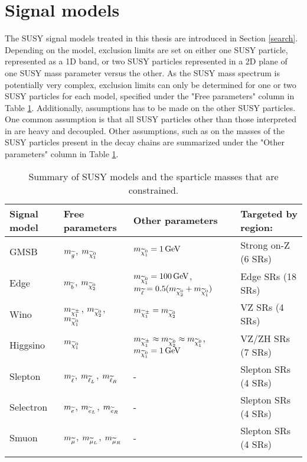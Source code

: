 \section{Signal models}
\noindent
\justify
The SUSY signal models treated in this thesis are introduced in Section \ref{search}. 
Depending on the model, exclusion limits are set on either one SUSY particle, represented as a 1D band, or two SUSY particles represented in a 2D plane of one SUSY mass parameter versus the other.    
As the SUSY mass spectrum is potentially very complex, exclusion limits can only be determined for one or two SUSY particles for each model, specified under the "Free parameters" column in Table \ref{tab:signal}. 
Additionally, assumptions has to be made on the other SUSY particles.
One common assumption is that all SUSY particles other than those interpreted in are heavy and decoupled. 
Other assumptions, such as on the masses of the SUSY particles present in the decay chains are summarized under the "Other parameters" column in Table \ref{tab:signal}.  
\begin{table}[!hbtp]
\renewcommand{\arraystretch}{1.2}
\setlength{\belowcaptionskip}{6pt}
\small
\centering                             
\caption{Summary of SUSY models and the sparticle masses that are constrained.}
\begin{tabular}{l l l l}
\hline\hline
Signal model                         & Free parameters    & Other parameters & Targeted by region:    \\
\hline
GMSB                                 & $m_{\widetilde{g}}$, $m_{\widetilde{\chi}^{0}_{1}}$   & $m_{\widetilde{\chi}^{0}_{1}}=1\,\text{Ge\hspace{-.08em}V}$   & Strong on-Z (6 SRs)\\                          
Edge                                 & $m_{\widetilde{b}}$, $m_{\widetilde{\chi}^{0}_{2}}$  & $m_{\widetilde{\chi}^{0}_{1}}=100\,\text{Ge\hspace{-.08em}V}$, $m_{\widetilde{\ell}}=0.5(m_{\widetilde{\chi}^{0}_{2}}+m_{\widetilde{\chi}^{0}_{1}})$   & Edge SRs (18 SRs)\\                          
Wino                                 & $m_{\widetilde{\chi}^\pm_{1}}$, $m_{\widetilde{\chi}^{0}_{2}}$, $m_{\widetilde{\chi}^{0}_{1}}$  & $m_{\widetilde{\chi}^\pm_{1}}=m_{\widetilde{\chi}^{0}_{2}}$   & VZ SRs (4 SRs)\\                          
Higgsino                             & $m_{\widetilde{\chi}^{0}_{1}}$  & $m_{\widetilde{\chi}^\pm_{1}}\approx m_{\widetilde{\chi}^{0}_{2}}\approx m_{\widetilde{\chi}^{0}_{1}}$, $m_{\widetilde{\chi}^{0}_{1}}=1\,\text{Ge\hspace{-.08em}V}$   & VZ/ZH SRs (7 SRs)\\                          
Slepton                              & $m_{\widetilde{\ell}}$, $m_{\widetilde{\ell}_{L}}$, $m_{\widetilde{\ell}_{R}}$  & -   & Slepton SRs (4 SRs)\\                          
Selectron                            & $m_{\widetilde{e}}$, $m_{\widetilde{e}_{L}}$, $m_{\widetilde{e}_{R}}$  & -  & Slepton SRs (4 SRs)\\                          
Smuon                                & $m_{\widetilde{\mu}}$, $m_{\widetilde{\mu}_{L}}$, $m_{\widetilde{\mu}_{R}}$  & -   & Slepton SRs (4 SRs)\\                          
\hline\hline
\label{tab:signal}
\end{tabular}
\end{table}                                                                                                         

